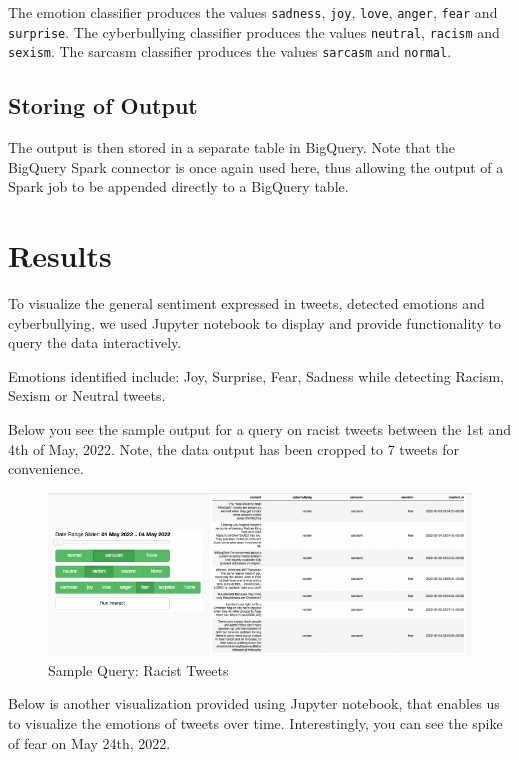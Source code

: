 \documentclass[a4paper,12pt]{article}
\begin{document}
The emotion classifier produces the values \texttt{sadness}, \texttt{joy}, \texttt{love}, \texttt{anger}, \texttt{fear} and \texttt{surprise}. The cyberbullying classifier produces the values \texttt{neutral}, \texttt{racism} and \texttt{sexism}. The sarcasm classifier produces the values \texttt{sarcasm} and \texttt{normal}. 

\subsection{Storing of Output}
The output is then stored in a separate table in BigQuery. Note that the BigQuery Spark connector is once again used here, thus allowing the output of a Spark job to be appended directly to a BigQuery table.

\section{Results}

To visualize the general sentiment expressed in tweets, detected emotions and cyberbullying, we used Jupyter notebook to
display and provide functionality to query the data interactively.

Emotions identified include: Joy, Surprise, Fear, Sadness while detecting Racism, Sexism or Neutral tweets.

Below you see the sample output for a query on racist tweets between the 1st and 4th of May, 2022. Note, the data output
has been cropped to 7 tweets for convenience.

\begin{figure}[h]
	\centering
	\includegraphics[width=\textwidth]{racism.png}
	\caption{Sample Query: Racist Tweets}
	\label{fig:Racist-Tweet-Query}
\end{figure}

Below is another visualization provided using Jupyter notebook, that enables us to visualize the emotions of tweets over time.
Interestingly, you can see the spike of fear on May 24th, 2022.
\end{document}
